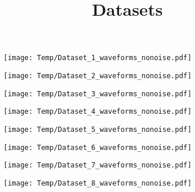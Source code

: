 \documentclass[14pt,a4paper]{extarticle}
\title{Datasets}
\author{}
\date{}
\begin{document}
\begin{figure}
\centering
\texttt{[image: Temp/Dataset\_1\_waveforms\_nonoise.pdf]}
\end{figure}

\begin{figure}
\centering
\texttt{[image: Temp/Dataset\_2\_waveforms\_nonoise.pdf]}
\end{figure}

\begin{figure}
\centering
\texttt{[image: Temp/Dataset\_3\_waveforms\_nonoise.pdf]}
\end{figure}

\begin{figure}
\centering
\texttt{[image: Temp/Dataset\_4\_waveforms\_nonoise.pdf]}
\end{figure}

\begin{figure}
\centering
\texttt{[image: Temp/Dataset\_5\_waveforms\_nonoise.pdf]}
\end{figure}

\begin{figure}
\centering
\texttt{[image: Temp/Dataset\_6\_waveforms\_nonoise.pdf]}
\end{figure}

\begin{figure}
\centering
\texttt{[image: Temp/Dataset\_7\_waveforms\_nonoise.pdf]}
\end{figure}

\begin{figure}
\centering
\texttt{[image: Temp/Dataset\_8\_waveforms\_nonoise.pdf]}
\end{figure}
\end{document}

